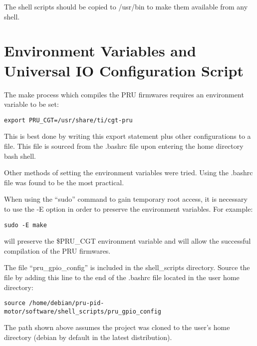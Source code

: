	The shell scripts should be copied to /usr/bin to make them available from any shell.
	
\section{Environment Variables and Universal IO Configuration Script}

The make process which compiles the PRU firmwares requires an environment variable to be set:

\begin{verbatim}
export PRU_CGT=/usr/share/ti/cgt-pru
\end{verbatim}

This is best done by writing this export statement plus other configurations to a file.
This file is sourced from the .bashrc file upon entering the home directory bash shell.

Other methods of setting the environment variables were tried. Using the .bashrc file was found to be the most practical.

When using the ``sudo'' command to gain temporary root access, it is necessary to use the -E option in order to preserve the environment variables.  For example:

\begin{verbatim}
sudo -E make
\end{verbatim}

will preserve the \$PRU\_CGT environment variable and will allow the successful compilation of the PRU firmwares.

The file ``pru\_gpio\_config'' is included in the shell\_scripts directory.  Source the file by adding this line to the end of the .bashrc file located in the user home directory:

\begin{verbatim}
source /home/debian/pru-pid-motor/software/shell_scripts/pru_gpio_config
\end{verbatim}

The path shown above assumes the project was cloned to the user's home directory (debian by default in the latest distribution).

